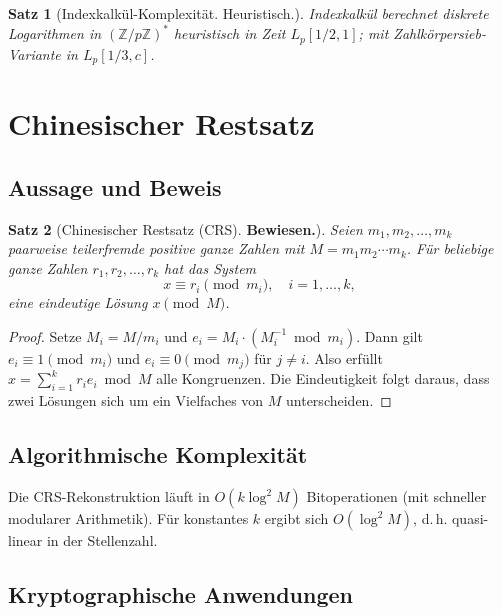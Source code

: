 \documentclass[12pt,a4paper]{amsart}
\newtheorem{theorem}{Satz}[section]
\theoremstyle{definition}
\begin{document}
\begin{theorem}[Indexkalkül-Komplexität. Heuristisch.]
Indexkalkül berechnet diskrete Logarithmen in $(\mathbb{Z}/p\mathbb{Z})^*$
heuristisch in Zeit $L_p[1/2, 1]$; mit Zahlkörpersieb-Variante in $L_p[1/3, c]$.
\end{theorem}

\section{Chinesischer Restsatz}

\subsection{Aussage und Beweis}

\begin{theorem}[Chinesischer Restsatz (CRS). \textbf{Bewiesen.}]
Seien $m_1, m_2, \ldots, m_k$ paarweise teilerfremde positive ganze Zahlen mit
$M = m_1 m_2 \cdots m_k$. Für beliebige ganze Zahlen $r_1, r_2, \ldots, r_k$
hat das System
\[
  x \equiv r_i \pmod{m_i}, \quad i = 1, \ldots, k,
\]
eine eindeutige Lösung $x \pmod{M}$.
\end{theorem}

\begin{proof}
Setze $M_i = M/m_i$ und $e_i = M_i \cdot (M_i^{-1} \bmod m_i)$. Dann gilt
$e_i \equiv 1 \pmod{m_i}$ und $e_i \equiv 0 \pmod{m_j}$ für $j \ne i$.
Also erfüllt $x = \sum_{i=1}^k r_i e_i \bmod M$ alle Kongruenzen. Die
Eindeutigkeit folgt daraus, dass zwei Lösungen sich um ein Vielfaches von $M$
unterscheiden.
\end{proof}

\subsection{Algorithmische Komplexität}

Die CRS-Rekonstruktion läuft in $O(k \log^2 M)$ Bitoperationen (mit schneller
modularer Arithmetik). Für konstantes $k$ ergibt sich $O(\log^2 M)$, d.\,h.
quasi-linear in der Stellenzahl.

\subsection{Kryptographische Anwendungen}
\end{document}
